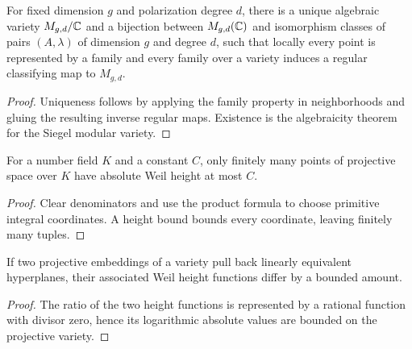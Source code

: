 \begin{theorem}
\label{thm:milne-siegel-moduli-complex}

For fixed dimension $g$ and polarization degree $d$, there is a unique
algebraic variety $M_{g,d}/\mathbb{C}$ and a bijection between $M_{g,d}(\mathbb{C})$ and
isomorphism classes of pairs $(A,\lambda)$ of dimension $g$ and degree $d$,
such that locally every point is represented by a family and every family over
a variety induces a regular classifying map to $M_{g,d}$.
\end{theorem}

\begin{proof}

Uniqueness follows by applying the family property in neighborhoods and gluing
the resulting inverse regular maps.  Existence is the algebraicity theorem for
the Siegel modular variety.

\end{proof}


\begin{proposition}
\label{prop:milne-projective-height}

For a number field $K$ and a constant $C$, only finitely many points of
projective space over $K$ have absolute Weil height at most $C$.
\end{proposition}

\begin{proof}

Clear denominators and use the product formula to choose primitive integral
coordinates.  A height bound bounds every coordinate, leaving finitely many
tuples.

\end{proof}


\begin{proposition}
\label{prop:milne-projective-height-comparison}

If two projective embeddings of a variety pull back linearly equivalent
hyperplanes, their associated Weil height functions differ by a bounded amount.
\end{proposition}

\begin{proof}

The ratio of the two height functions is represented by a rational function
with divisor zero, hence its logarithmic absolute values are bounded on the
projective variety.

\end{proof}


